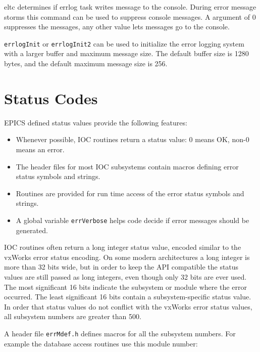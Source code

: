 eltc determines if errlog task writes message to the console.
During error message storms this command can be used to suppress console messages.
A argument of 0 suppresses the messages, any other value lets messages go to the console.

\verb|errlogInit| or \verb|errlogInit2| can be used to initialize the error logging system with a larger buffer and maximum message size.
The default buffer size is 1280 bytes, and the default maximum message size is 256.

\section{Status Codes}

EPICS defined status values provide the following features:

\begin{itemize}
\item Whenever possible, IOC routines return a status value:
0 means OK, non-0 means an error.

\item The header files for most IOC subsystems contain macros defining error status symbols and strings.

\item Routines are provided for run time access of the error status symbols and strings.

\item A global variable \verb|errVerbose| helps code decide if error messages should be generated.

\end{itemize}

IOC routines often return a long integer status value, encoded similar to the vxWorks error status encoding.
On some modern architectures a long integer is more than 32 bits wide, but in order to keep the API compatible the status values are still passed as long integers, even though only 32 bits are ever used.
The most significant 16 bits indicate the subsystem or module where the error occurred.
The least significant 16 bits contain a subsystem-specific status value.
In order that status values do not conflict with the vxWorks error status values, all subsystem numbers are greater than 500.

A header file \verb|errMdef.h| defines macros for all the subsystem numbers.
For example the database access routines use this module number:

